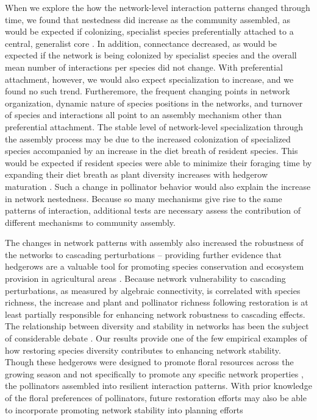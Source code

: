 \documentclass[12pt]{article}
\begin{document}
When we explore the how the network-level interaction patterns changed
through time, we found that nestedness did increase as the community
assembled, as would be expected if colonizing, specialist species
preferentially attached to a central, generalist core
\citep{albrecht2010plant}. In addition, connectance decreased, as
would be expected if the network is being colonized by specialist
species and the overall mean number of interactions per species did
not change. With preferential attachment, however, we would also
expect specialization to increase, and we found no such
trend. Furtheremore, the frequent changing points in network
organization, dynamic nature of species positions in the networks, and
turnover of species and interactions all point to an assembly
mechanism other than preferential attachment.  The stable level of
network-level specialization through the assembly process may be due
to the increased colonization of specialized species
\citep{mgonigle-2015-x} accompanied by an increase in the diet breath
of resident species. This would be expected if resident species were
able to minimize their foraging time by expanding their diet breath as
plant diversity increases with hedgerow maturation \citep{Waser1996,
  pyke1984optimal, Bluthgen2007, albrecht2010plant}. Such a change in
pollinator behavior would also explain the increase in network
nestedness. Because so many mechanisms give rise to the same patterns
of interaction, additional tests are necessary assess the contribution
of different mechanisms to community assembly.

The changes in network patterns with assembly also increased the
robustness of the networks to cascading perturbations -- providing
further evidence that hedgerows are a valuable tool for promoting
species conservation and ecosystem provision in agricultural areas
\citep{mgonigle-2015-x, ponisio2015farm, kremen-2015-602}. Because
network vulnerability to cascading perturbations, as measured by
algebraic connectivity, is correlated with species richness, the
increase and plant and pollinator richness following restoration is at
least partially responsible for enhancing network robustness to
cascading effects. The relationship between diversity and stability in
networks has been the subject of considerable debate
\citep[e.g.,][]{may1972will, pimm1984complexity,
  montoya2006ecological}. Our results provide one of the few empirical
examples of how restoring species diversity contributes to enhancing
network stability. Though these hedgerows were designed to promote
floral resources across the growing season and not specifically to
promote any specific network properties \citep{menz-2010-4}, the
pollinators assembled into resilient interaction patterns. With prior
knowledge of the floral preferences of pollinators, future restoration
efforts may also be able to incorporate promoting network stability
into planning efforts \citep{mgonigle2016tool}
\end{document}

